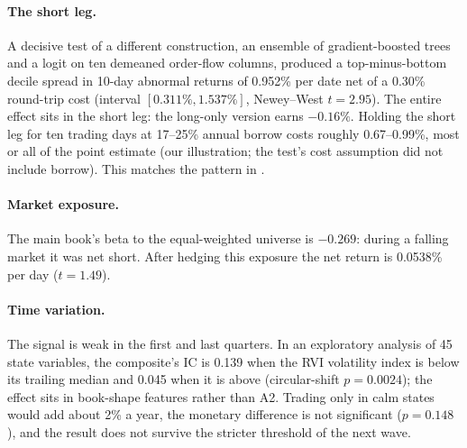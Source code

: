 \paragraph{The short leg.} A decisive test of a different construction, an ensemble of gradient-boosted trees and a logit on ten demeaned order-flow columns, produced a top-minus-bottom decile spread in 10-day abnormal returns of 0.952\% per date net of a 0.30\% round-trip cost (interval $[0.311\%,1.537\%]$, Newey--West $t=2.95$). The entire effect sits in the short leg: the long-only version earns $-0.16\%$. Holding the short leg for ten trading days at 17--25\% annual borrow costs roughly 0.67--0.99\%, most or all of the point estimate (our illustration; the test's cost assumption did not include borrow). This matches the pattern in \citet{muravyev2025}.

\paragraph{Market exposure.} The main book's beta to the equal-weighted universe is $-0.269$: during a falling market it was net short. After hedging this exposure the net return is 0.0538\% per day ($t=1.49$).

\paragraph{Time variation.} The signal is weak in the first and last quarters. In an exploratory analysis of 45 state variables, the composite's IC is 0.139 when the RVI volatility index is below its trailing median and 0.045 when it is above (circular-shift $p=0.0024$); the effect sits in book-shape features rather than A2. Trading only in calm states would add about 2\% a year, the monetary difference is not significant ($p=0.148$), and the result does not survive the stricter threshold of the next wave.

